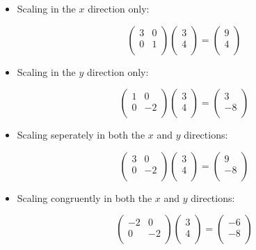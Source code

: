 \documentclass[a4paper,oneside]{report}
\begin{document}
\begin{itemize}
	\item{Scaling in the \( x \) direction only:

\[ \begin{pmatrix}
	3 & 0 \\
	0 & 1 \\
\end{pmatrix} \begin{pmatrix}
	3 \\
	4 \\
\end{pmatrix} = \begin{pmatrix}
	9 \\
	4 \\
\end{pmatrix} \]
		}
	\item{Scaling in the \( y \) direction only:

\[ \begin{pmatrix}
	1 & 0 \\
	0 & -2 \\
\end{pmatrix} \begin{pmatrix}
	3 \\
	4 \\
\end{pmatrix} = \begin{pmatrix}
	3 \\
	-8 \\
\end{pmatrix} \]
		}
	\item{Scaling seperately in both the \( x \) and \( y \)
		directions:

\[ \begin{pmatrix}
	3 & 0 \\
	0 & -2 \\
\end{pmatrix} \begin{pmatrix}
	3 \\
	4 \\
\end{pmatrix} = \begin{pmatrix}
	9 \\
	-8 \\
\end{pmatrix} \]
		}
	\item{Scaling congruently in both the \( x \) and \( y \) directions:

		\[ \begin{pmatrix}
			-2 & 0 \\
			0 & -2 \\
		\end{pmatrix} \begin{pmatrix}
			3 \\
			4 \\
		\end{pmatrix} = \begin{pmatrix}
			-6 \\
			-8 \\
		\end{pmatrix} \]
		}
\end{itemize}
\end{document}
